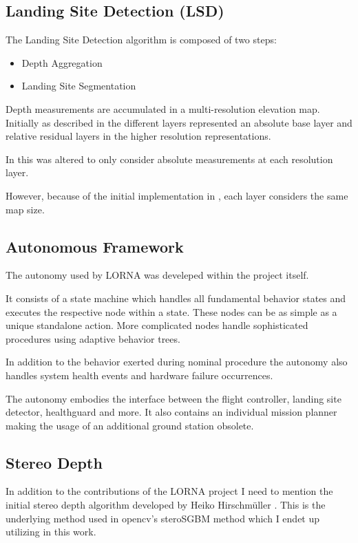 \subsection{Landing Site Detection (LSD)}\label{subsec:related_work:LSD}

The Landing Site Detection algorithm is composed of two steps: 

\begin{itemize}
    \item Depth Aggregation
    \item Landing Site Segmentation
\end{itemize}

Depth measurements are accumulated in a multi-resolution elevation map. Initially as described in \citet{LSD1} the different layers represented an absolute base layer and relative residual layers in the higher resolution representations.

In \citet{LSD2} this was altered to only consider absolute measurements at each resolution layer. 

However, because of the initial implementation in \citep{LSD1}, each layer considers the same map size. 



\subsection{Autonomous Framework}

The autonomy \citep{Autonomy} used by LORNA was develeped within the project itself. 

It consists of a state machine which handles all fundamental behavior states and executes the respective node within a state. These nodes can be as simple as a unique standalone action. More complicated nodes handle sophisticated procedures using adaptive behavior trees. 

In addition to the behavior exerted during nominal procedure the autonomy also handles system health events and hardware failure occurrences.

The autonomy embodies the interface between the flight controller, landing site detector, healthguard and more. It also contains an individual mission planner making the usage of an additional ground station obsolete.

\subsection{Stereo Depth}

In addition to the contributions of the LORNA project I need to mention the initial stereo depth algorithm developed by Heiko Hirschmüller \citep{Stereo}. This is the underlying method used in opencv's steroSGBM method which I endet up utilizing in this work.